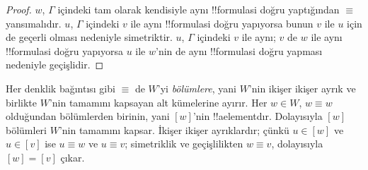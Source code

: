 \begin{proof}
  $w$, $\Gamma$ içindeki tam olarak kendisiyle aynı !!{formula}s{}i doğru
  yaptığından $\equiv$ yansımalıdır. $u$, $\Gamma$ içindeki $v$ ile aynı
  !!{formula}s{}i doğru yapıyorsa bunun $v$ ile $u$ için de geçerli olması
  nedeniyle simetriktir. $u$, $\Gamma$ içindeki $v$ ile aynı; $v$ de $w$
  ile aynı !!{formula}s{}i doğru yapıyorsa $u$ ile $w$'nin de aynı
  !!{formula}s{}i doğru yapması nedeniyle geçişlidir.
\end{proof}

Her denklik bağıntısı gibi $\equiv$ de $W$'yi \emph{bölümlere}, yani
$W$'nin ikişer ikişer ayrık ve birlikte $W$'nin tamamını kapsayan alt
kümelerine ayırır. Her $w\in W$, $w\equiv w$ olduğundan bölümlerden birinin,
yani $[w]$'nin !!a{element}{}dır. Dolayısıyla $[w]$ bölümleri $W$'nin
tamamını kapsar. İkişer ikişer ayrıklardır; çünkü $u\in[w]$ ve $u\in[v]$
ise $u\equiv w$ ve $u\equiv v$; simetriklik ve geçişlilikten $w\equiv v$,
dolayısıyla $[w]=[v]$ çıkar.

